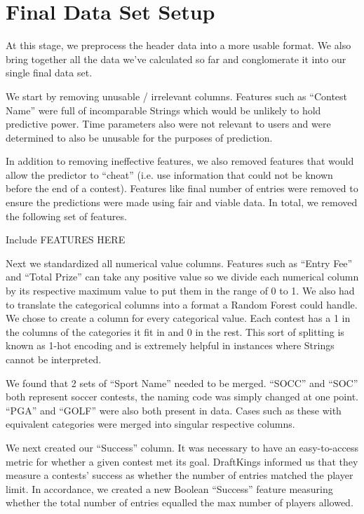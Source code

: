 \section{Final Data Set Setup}

At this stage, we preprocess the header data into a more usable format. We also bring together all the data we've calculated so far and conglomerate it into our single final data set.

We start by removing unusable / irrelevant columns. Features such as ``Contest Name'' were full of incomparable Strings which would be unlikely to hold predictive power. Time parameters also were not relevant to users and were determined to also be unusable for the purposes of prediction. 

In addition to removing ineffective features, we also removed features that would allow the predictor to ``cheat'' (i.e. use information that could not be known before the end of a contest). Features like final number of entries were removed to ensure the predictions were made using fair and viable data. In total, we removed the following set of features.

Include FEATURES HERE


Next we standardized all numerical value columns. Features such as ``Entry Fee'' and ``Total Prize'' can take any positive value so we divide each numerical column by its respective maximum value to put them in the range of 0 to 1. We also had to translate the categorical columns into a format a Random Forest could handle. We chose to create a column for every categorical value.  Each contest has a 1 in the columns of the categories it fit in and 0 in the rest.  This sort of splitting is known as 1-hot encoding and is extremely helpful in instances where Strings cannot be interpreted.

We found that 2 sets of ``Sport Name'' needed to be merged. ``SOCC'' and ``SOC'' both represent soccer contests, the naming code was simply changed at one point. ``PGA'' and ``GOLF'' were also both present in data. Cases such as these with equivalent categories were merged into singular respective columns.

We next created our ``Success'' column. It was necessary to have an easy-to-access metric for whether a given contest met its goal. DraftKings informed us that they measure a contests' success as whether the number of entries matched the player limit. In accordance, we created a new Boolean ``Success'' feature measuring whether the total number of entries equalled the max number of players allowed.

